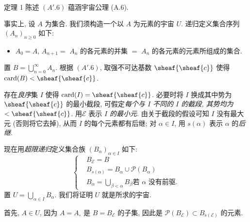 

\hypertarget{sga4.exp.I.appendix.II.sec.5.theorem.1}{}
\begin{enonce*}{定理 %
1} 陈述 \hyperlink{sga4.exp.I.appendix.II.sec.5.axiom.A-prime.6}{$(A'.6)$} 蕴涵宇宙公理 (A.6).
\end{enonce*}
事实上, 设 $A$ 为集合. 我们须构造一个以 $A$ 为元素的宇宙 $U$. 递归定义集合序列 $(A_n)_{n\geq0}$ 如下:
\begin{itemize}
\hypertarget{sga4.exp.I.appendix.II.sec.5.theorem.1.proof.equation.2}{}
\item[(2)] $A_0=A$, $A_{n+1}=$ $A_n$ 的各元素的并集 $=$ $A_n$ 的各元素的元素所组成的集合.
\end{itemize}
\noindent 置 $B=\bigcup^\infty_{n=0}A_n$. 根据 \hyperlink{sga4.exp.I.appendix.II.sec.5.axiom.A-prime.6}{$(A'.6)$}, 取强不可达基数 $\sheaf{\sheaf{c}}$ 使得 $\card(B)<\sheaf{\sheaf{c}}$.

存在\emph{良序}集 $I$ 使得 $\card(I)=\sheaf{\sheaf{c}}$. 必要时将 $I$ 换成其中势为 $\sheaf{\sheaf{c}}$ 的最小截段, 可假定\emph{每个与 $I$ 不同的 $I$ 的截段, 其势均为 $<\sheaf{\sheaf{c}}$}. 用\pageoriginale $\mathcal{E}$ 表示 \emph{$I$ 的最小元}. 由关于截段的假设可知 $I$ 没有最大元 (否则将它去掉), 从而 $I$ 的每个元素都有后继; 对 $\alpha\in I$, 用 $s(\alpha)$ 表示 $\alpha$ 的\emph{后继}.

现在用\emph{超限递归}定义集合族 $(B_\alpha)_{\alpha\in I}$ 如下:
\hypertarget{sga4.exp.I.appendix.II.sec.5.theorem.1.proof.equation.3}{}
\begin{equation}
\begin{cases}
& B_{\mathcal{E}}=B\\
& B_{s(\alpha)}=B_{\alpha}\cup \mathcal{P}(B_{\alpha})\\
& B_{\alpha}={\displaystyle{\bigcup_{\beta<\alpha}}}B_{\beta}\mbox{
若 $\alpha$ 没有前驱.}
\end{cases}\tag{3}
\end{equation}
置 $U=\bigcup_{\alpha\in I}B_\alpha$. 我们将证明 $U$ 就是所求的宇宙.

首先, $A\in U$, 因为 $A=A_\circ$ 是 $B=B_{\mathcal{E}}$ 的子集, 因此是 $\mathcal{P}(B_{\mathcal{E}})\subset B_{s(\mathcal{E})}$ 的元素.

